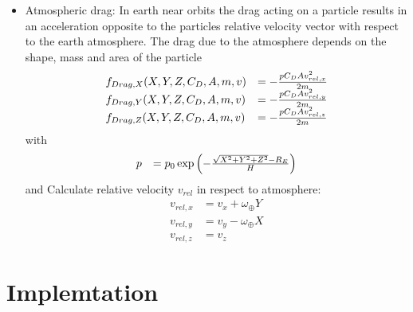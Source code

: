 \documentclass[11pt,
               a4paper,
               bibtotoc,
               idxtotoc,
               headsepline,
               footsepline,
               footexclude,
               BCOR12mm,
               DIV13,
               openany,   %
               ]
               {scrbook}
\begin{document}
\begin{itemize}
        \item Atmospheric drag: In earth near orbits the drag acting on a particle results in an acceleration opposite to the particles relative velocity vector with respect to the earth atmosphere.
        The drag due to the atmosphere depends on the shape, mass and area of the particle
        \begin{equation}
            \begin{array}{ll}
                f_{Drag,X}(X,Y,Z,C_D,A,m,v) &= -{{pC_DAv_{rel,x}^2} \over {2m}} \\
                f_{Drag,Y}(X,Y,Z,C_D,A,m,v) &= -{{pC_DAv_{rel,y}^2} \over {2m}} \\
                f_{Drag,Z}(X,Y,Z,C_D,A,m,v) &= -{{pC_DAv_{rel,z}^2} \over {2m}}
            \end{array}
        \end{equation}
        with
        \begin{equation}
            \begin{array}{ll}
                p &= p_0\exp\left(-{{\sqrt{X^2+Y^2+Z^2} - R_E} \over H}\right)
            \end{array}
        \end{equation}
        and
        Calculate relative velocity \(v_{rel}\) in respect to atmosphere:
        \begin{equation}
            \begin{array}{ll}
                v_{rel,x} &= v_x + \omega_{\oplus}Y \\
                v_{rel,y} &= v_y - \omega_{\oplus}X \\
                v_{rel,z} &= v_z
            \end{array}
        \end{equation}

    \end{itemize}

\part{Implemtation}
\end{document}
